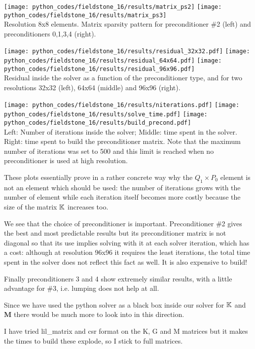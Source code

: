\begin{center} 
\texttt{[image: python\_codes/fieldstone\_16/results/matrix\_ps2]}
\texttt{[image: python\_codes/fieldstone\_16/results/matrix\_ps3]}\\
{\captionfont Resolution 8x8 elements. Matrix sparsity pattern 
for preconditioner \#2 (left) and preconditioners 0,1,3,4 (right).}
\end{center}


\begin{center} 
\texttt{[image: python\_codes/fieldstone\_16/results/residual\_32x32.pdf]}
\texttt{[image: python\_codes/fieldstone\_16/results/residual\_64x64.pdf]}
\texttt{[image: python\_codes/fieldstone\_16/results/residual\_96x96.pdf]}\\
{\captionfont Residual inside the solver as a function of the preconditioner type, 
and for two resolutions 32x32 (left), 64x64 (middle) and 96x96 (right).}
\end{center}


\begin{center} 
\texttt{[image: python\_codes/fieldstone\_16/results/niterations.pdf]}
\texttt{[image: python\_codes/fieldstone\_16/results/solve\_time.pdf]}
\texttt{[image: python\_codes/fieldstone\_16/results/build\_precond.pdf]}\\
{\captionfont Left: Number of iterations inside the solver; 
Middle: time spent in the solver.
Right: time spent to build the preconditioner matrix.
Note that the maximum number of iterations was set to 500 and this 
limit is reached when no preconditioner is used at high resolution.}
\end{center} 

These plots essentially prove in a rather concrete way why the $Q_1\times P_0$ element 
is not an element which should be used: the number of iterations grows with the 
number of element while each iteration itself becomes more costly because the size of the 
matrix ${\mathbb{K}}$ increases too.

We see that the choice of preconditioner is important. Preconditioner \#2 gives the best 
and most predictable results but its preconditioner matrix is not diagonal so that 
its use implies solving with it at each solver iteration, which has a cost: although at 
resolution 96x96 it requires the least iterations, the total time spent in the solver does
not reflect this fact as well. It is also expensive to build! 

Finally preconditioners 3 and 4 show extremely similar results, with a little 
advantage for \#3, i.e. lumping does not help at all.

Since we have used the python solver as a black box inside our solver for ${\mathbb{K}}$ and ${\bm M}$
there would be much more to look into in this direction.

\begin{remark}
I have tried lil\_matrix and csr format on the K, G and M matrices 
but it makes the times to build these explode, so I stick to full matrices. 
\end{remark}




